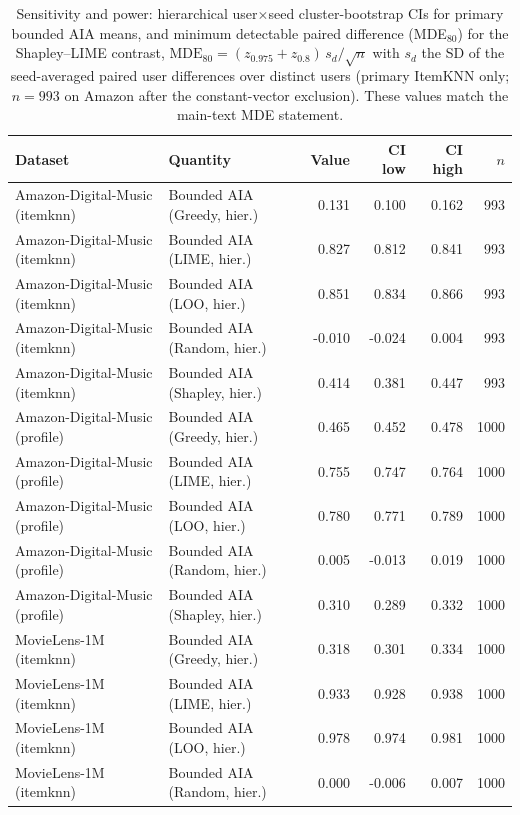 \begin{table}[!htbp]\centering\scriptsize\setlength{\tabcolsep}{3pt}
\caption{Sensitivity and power: hierarchical user$\times$seed cluster-bootstrap
CIs for primary bounded AIA means, and minimum detectable paired difference
(MDE$_{80}$) for the Shapley--LIME contrast, $\mathrm{MDE}_{80}=(z_{0.975}+z_{0.8})\,s_d/\sqrt{n}$
with $s_d$ the SD of the seed-averaged paired user differences over distinct
users (primary ItemKNN only; $n=993$ on Amazon after the constant-vector
exclusion). These values match the main-text MDE statement.}
\label{tab:sens-power}
\begin{tabular}{@{}llrrrr@{}}
\toprule
Dataset & Quantity & Value & CI low & CI high & $n$ \\
\midrule
Amazon-Digital-Music (itemknn) & Bounded AIA (Greedy, hier.) & 0.131 & 0.100 & 0.162 & 993 \\
Amazon-Digital-Music (itemknn) & Bounded AIA (LIME, hier.) & 0.827 & 0.812 & 0.841 & 993 \\
Amazon-Digital-Music (itemknn) & Bounded AIA (LOO, hier.) & 0.851 & 0.834 & 0.866 & 993 \\
Amazon-Digital-Music (itemknn) & Bounded AIA (Random, hier.) & -0.010 & -0.024 & 0.004 & 993 \\
Amazon-Digital-Music (itemknn) & Bounded AIA (Shapley, hier.) & 0.414 & 0.381 & 0.447 & 993 \\
Amazon-Digital-Music (profile) & Bounded AIA (Greedy, hier.) & 0.465 & 0.452 & 0.478 & 1000 \\
Amazon-Digital-Music (profile) & Bounded AIA (LIME, hier.) & 0.755 & 0.747 & 0.764 & 1000 \\
Amazon-Digital-Music (profile) & Bounded AIA (LOO, hier.) & 0.780 & 0.771 & 0.789 & 1000 \\
Amazon-Digital-Music (profile) & Bounded AIA (Random, hier.) & 0.005 & -0.013 & 0.019 & 1000 \\
Amazon-Digital-Music (profile) & Bounded AIA (Shapley, hier.) & 0.310 & 0.289 & 0.332 & 1000 \\
MovieLens-1M (itemknn) & Bounded AIA (Greedy, hier.) & 0.318 & 0.301 & 0.334 & 1000 \\
MovieLens-1M (itemknn) & Bounded AIA (LIME, hier.) & 0.933 & 0.928 & 0.938 & 1000 \\
MovieLens-1M (itemknn) & Bounded AIA (LOO, hier.) & 0.978 & 0.974 & 0.981 & 1000 \\
MovieLens-1M (itemknn) & Bounded AIA (Random, hier.) & 0.000 & -0.006 & 0.007 & 1000 \\

\end{tabular}
\end{table}
